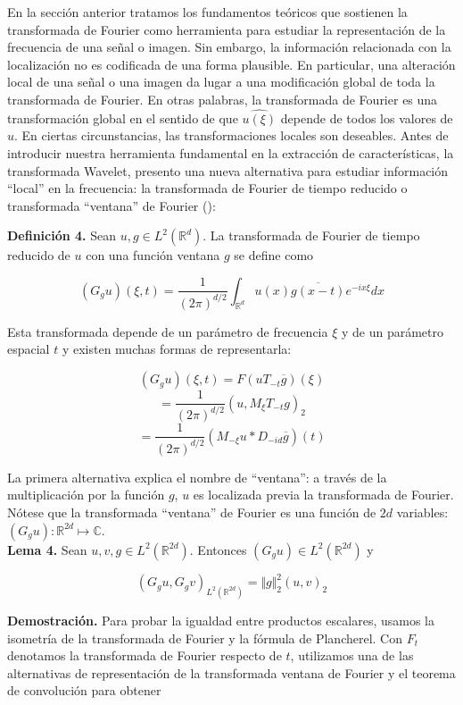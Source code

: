 \begin{itemize}
En la sección anterior tratamos los fundamentos teóricos que sostienen la transformada de Fourier como herramienta para estudiar la representación de la frecuencia de una señal o imagen. Sin embargo, la información relacionada con la localización no es codificada de una forma plausible. En particular, una alteración local de una señal o una imagen da lugar a una modificación global de toda la transformada de Fourier. En otras palabras, la transformada de Fourier es una transformación global en el sentido de que $\hat{u(\xi)}$ depende de todos los valores de $u$. En ciertas circunstancias, las transformaciones locales son deseables. Antes de introducir nuestra herramienta fundamental en la extracción de características, la transformada Wavelet, presento una nueva alternativa para estudiar información ``local'' en la frecuencia: la transformada de Fourier de tiempo reducido o transformada ``ventana'' de Fourier (\cite{stft}):

\textbf{Definición 4.} Sean $u,g \in L^2(\mathbb{R}^d)$. La transformada de Fourier de tiempo reducido de $u$ con una función ventana $g$ se define como

$$(G_g u)(\xi,t) = \frac{1}{(2\pi)^{d/2}}\int_{\mathbb{R}^d} u(x) \overline{g(x-t)} e^{-ix\xi}dx$$

Esta transformada depende de un parámetro de frecuencia $\xi$ y de un parámetro espacial $t$ y existen muchas formas de representarla:

$$(G_g u)(\xi,t) = F(uT_{-t} \overline{g})(\xi)$$
$$ = \frac{1}{(2\pi)^{d/2}} (u, M_\xi T_{-t}g)_2$$
$$ =  \frac{1}{(2\pi)^{d/2}} (M_{-\xi}u*D_{-id}\overline{g})(t)$$

La primera alternativa explica el nombre de ``ventana'': a través de la multiplicación por la función $g$, $u$ es localizada previa la transformada de Fourier. Nótese que la transformada ``ventana'' de Fourier es una función de $2d$ variables: $(G_g u): \mathbb{R}^{2d} \mapsto \mathbb{C}$. \\

\textbf{Lema 4.} Sean $u,v,g \in L^2(\mathbb{R}^{2d})$. Entonces  $(G_g u) \in L^2(\mathbb{R}^{2d})$ y 

$$(G_g u, G_g v)_{L^2(\mathbb{R}^{2d})} = \Vert g \Vert_2^2(u,v)_2$$

\textbf{Demostración.} Para probar la igualdad entre productos escalares, usamos la isometría de la transformada de Fourier y la fórmula de Plancherel. Con $F_t$ denotamos la transformada de Fourier respecto de $t$, utilizamos una de las alternativas de representación de la transformada ventana de Fourier y el teorema de convolución para obtener


\end{itemize}
